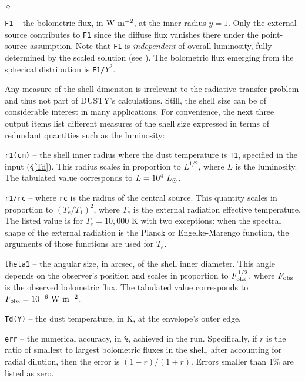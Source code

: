 \documentclass[12pt]{article} \usepackage{epsf}
\def\D  {{\sf DUSTY}}
\def\E#1{\hbox{$10^{#1}$}}
\def\Lo     {\hbox{$L_{\odot}$}}
\begin{document}
\begin{list}{$\diamond$}{}
\item
{\tt F1} -- the bolometric flux, in $\rm W\ m^{-2}$, at the inner radius $y =
1$. Only the external source contributes to {\tt F1} since the diffuse flux
vanishes there under the point-source assumption. Note that {\tt F1} is {\em
independent} of overall luminosity, fully determined by the scaled solution
(see \cite{IE97}). The bolometric flux emerging from the spherical distribution
is {\tt F1/$Y^2$}.

Any measure of the shell dimension is irrelevant to the radiative transfer
problem and thus not part of \D's calculations.  Still, the shell size can be
of considerable interest in many applications. For convenience, the next three
output items list different measures of the shell size expressed in terms of
redundant quantities such as the luminosity:

\item
{\tt r1(cm)} -- the shell inner radius where the dust temperature is {\tt T1},
specified in the input (\S \ref{Td}).  This radius scales in proportion to
$L^{1/2}$, where $L$ is the luminosity. The tabulated value corresponds to $L =
\E4\ \Lo$.

\item
{\tt r1/rc} -- where {\tt rc} is the radius of the central source.  This
quantity scales in proportion to $(T_e/T_1)^2$, where $T_e$ is the external
radiation effective temperature.  The listed value is for $T_e = 10,000$ K with
two exceptions: when the spectral shape of the external radiation is the Planck
or Engelke-Marengo function, the arguments of those functions are used for
$T_e$.

\item
{\tt theta1} -- the angular size, in arcsec, of the shell inner diameter. This
angle depends on the observer's position and scales in proportion to $F_{\rm
obs}^{1/2}$, where $F_{\rm obs}$ is the observed bolometric flux.  The
tabulated value corresponds to $F_{\rm obs} = \E{-6}\ \rm W\ m^{-2}$.

\item
{\tt Td(Y)} -- the dust temperature, in K, at the envelope's outer edge.

\item
{\tt err} -- the numerical accuracy, in {\tt \%}, achieved in the run.
Specifically, if $r$ is the ratio of smallest to largest bolometric fluxes in
the shell, after accounting for radial dilution, then the error is $(1 - r)/(1
+ r)$. Errors smaller than 1\% are listed as zero.
\end{list}
\end{document}

